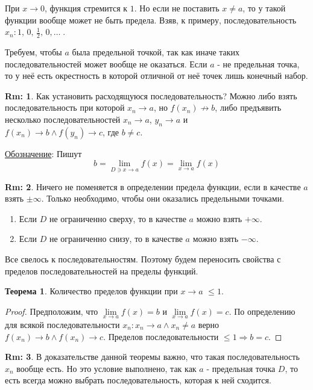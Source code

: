 \documentclass[12pt]{article}
\theoremstyle{definition}
\newtheorem{rem}{Rm:}
\newtheorem{theorem}{Теорема}
\begin{document}
При $x \to 0$, функция стремится к $1$. Но если не поставить $x\neq a$, то у такой функции вообще может не быть предела. Взяв, к примеру, последовательность $x_n \colon 1,\,0,\,\frac{1}{2},\, 0, \dotsc\;$.

Требуем, чтобы $a$ была предельной точкой, так как иначе таких последовательностей может вообще не оказаться. Если $a$ - не предельная точка, то у неё есть окрестность в которой отличной от неё точек лишь конечный набор.

\begin{rem}
	Как установить расходящуюся последовательность? Можно либо взять последовательность при которой $x_n \to a$, но $f(x_n) \not\to b$, либо предъявить несколько последовательностей $x_n \to a$, $y_n \to a$ и \\
	$f(x_n) \to b \wedge f(y_n) \to c$, где $b \neq c$.
\end{rem}

\uline{Обозначение}: Пишут 
$$b = \lim\limits_{D \ni x\to a}f(x) = \lim\limits_{ x\to a}f(x)$$

\begin{rem}	Ничего не поменяется в определении предела функции, если в качестве $a$ взять $\pm\infty$. Только необходимо, чтобы они оказались предельными точками.
	\begin{enumerate}[label={(\arabic*)}]
		\item Если $D$ не ограниченно сверху, то в качестве $a$ можно взять $+\infty$.
		\item Если $D$ не ограниченно снизу, то в качестве $a$ можно взять $-\infty$.
	\end{enumerate}
\end{rem}

Все свелось к последовательностям. Поэтому будем переносить свойства с пределов последовательностей на пределы функций.

\begin{theorem}
	Количество пределов функции при $x \to a$ $\leq 1$.
\end{theorem}

\begin{proof}
	Предположим, что $\lim\limits_{x \to a} f(x) = b$ и  $\lim\limits_{x \to a} f(x) = c$. По определению для всякой последовательности $x_n \colon x_n \to a \wedge x_n \neq a$ верно $f(x_n) \to b \wedge f(x_n) \to c$. Пределов последовательности $\leq 1 \Rightarrow b = c$. 
\end{proof}

\begin{rem}
	В доказательстве данной теоремы важно, что такая последовательность $x_n$ вообще есть. Но это условие выполнено, так как $a$ - предельная точка $D$, то есть всегда можно выбрать последовательность, которая к ней сходится.
\end{rem}
\end{document}
